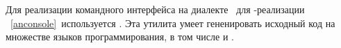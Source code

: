 \label{rageljava}\secdown

Для реализации командного интерфейса на диалекте \F\ для \A-реализации \metal\
\ref{anconsole}\ используется . Эта утилита умеет гененировать
исходный код на множестве языков программирования, в том числе и \java.


\clearpage
{}

\secup
